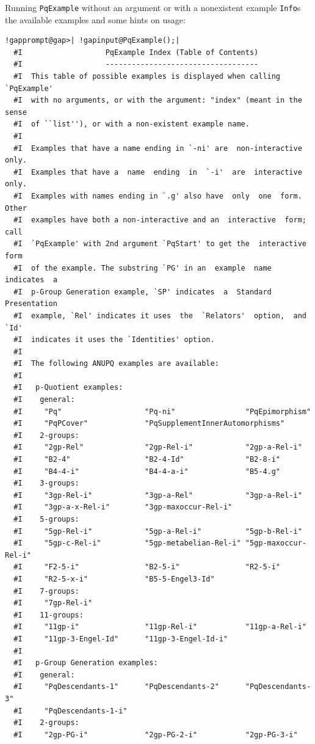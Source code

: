 \documentclass[a4paper,11pt]{report}
\begin{document}
{ Running \texttt{PqExample} without an argument or with a non\texttt{}existent example \texttt{Info}s the available examples and some hints on usage: 
\begin{Verbatim}[commandchars=!@|,fontsize=\small,frame=single,label=Example]
  !gapprompt@gap>| !gapinput@PqExample();|
  #I                   PqExample Index (Table of Contents)
  #I                   -----------------------------------
  #I  This table of possible examples is displayed when calling `PqExample'
  #I  with no arguments, or with the argument: "index" (meant in the  sense
  #I  of ``list''), or with a non-existent example name.
  #I  
  #I  Examples that have a name ending in `-ni' are  non-interactive  only.
  #I  Examples that have a  name  ending  in  `-i'  are  interactive  only.
  #I  Examples with names ending in `.g' also have  only  one  form.  Other
  #I  examples have both a non-interactive and an  interactive  form;  call
  #I  `PqExample' with 2nd argument `PqStart' to get the  interactive  form
  #I  of the example. The substring `PG' in an  example  name  indicates  a
  #I  p-Group Generation example, `SP' indicates  a  Standard  Presentation
  #I  example, `Rel' indicates it uses  the  `Relators'  option,  and  `Id'
  #I  indicates it uses the `Identities' option.
  #I  
  #I  The following ANUPQ examples are available:
  #I  
  #I   p-Quotient examples:
  #I    general:
  #I     "Pq"                   "Pq-ni"                "PqEpimorphism"        
  #I     "PqPCover"             "PqSupplementInnerAutomorphisms"
  #I    2-groups:
  #I     "2gp-Rel"              "2gp-Rel-i"            "2gp-a-Rel-i"
  #I     "B2-4"                 "B2-4-Id"              "B2-8-i"
  #I     "B4-4-i"               "B4-4-a-i"             "B5-4.g"
  #I    3-groups:
  #I     "3gp-Rel-i"            "3gp-a-Rel"            "3gp-a-Rel-i"
  #I     "3gp-a-x-Rel-i"        "3gp-maxoccur-Rel-i"
  #I    5-groups:
  #I     "5gp-Rel-i"            "5gp-a-Rel-i"          "5gp-b-Rel-i"
  #I     "5gp-c-Rel-i"          "5gp-metabelian-Rel-i" "5gp-maxoccur-Rel-i"
  #I     "F2-5-i"               "B2-5-i"               "R2-5-i"
  #I     "R2-5-x-i"             "B5-5-Engel3-Id"
  #I    7-groups:
  #I     "7gp-Rel-i"
  #I    11-groups:
  #I     "11gp-i"               "11gp-Rel-i"           "11gp-a-Rel-i"
  #I     "11gp-3-Engel-Id"      "11gp-3-Engel-Id-i"
  #I  
  #I   p-Group Generation examples:
  #I    general:
  #I     "PqDescendants-1"      "PqDescendants-2"      "PqDescendants-3"
  #I     "PqDescendants-1-i"
  #I    2-groups:
  #I     "2gp-PG-i"             "2gp-PG-2-i"           "2gp-PG-3-i"

\end{Verbatim}}
\end{document}
